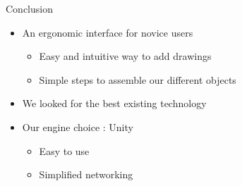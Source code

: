 \documentclass[a4paper,10pt]{beamer}
\begin{document}
		\begin{frame}{Conclusion}
			\begin{itemize}
				\item An ergonomic interface for novice users
					\begin{itemize}
						\item Easy and intuitive way to add drawings
						\item Simple steps to assemble our different objects
					\end{itemize}
				\item We looked for the best existing technology
				\item Our engine choice : Unity
					\begin{itemize}
						\item Easy to use
						\item Simplified networking
					\end{itemize}
				
			\end{itemize}
		\end{frame}
		
\end{document}
